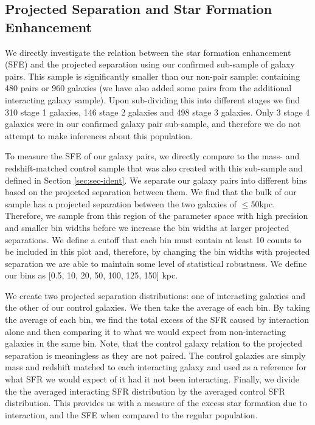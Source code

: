 \subsection{Projected Separation and Star Formation Enhancement}
\noindent We directly investigate the relation between the star formation enhancement (SFE) and the projected separation using our confirmed sub-sample of galaxy pairs. This sample is significantly smaller than our non-pair sample: containing 480 pairs or 960 galaxies (we have also added some pairs from the additional interacting galaxy sample). Upon sub-dividing this into different stages we find 310 stage 1 galaxies, 146 stage 2 galaxies and 498 stage 3 galaxies. Only 3 stage 4 galaxies were in our confirmed galaxy pair sub-sample, and therefore we do not attempt to make inferences about this population. 

To measure the SFE of our galaxy pairs, we directly compare to the mass- and redshift-matched control sample that was also created with this sub-sample and defined in Section \ref{sec:sec-ident}. We separate our galaxy pairs into different bins based on the projected separation between them. We find that the bulk of our sample has a projected separation between the two galaxies of $\leq$50kpc. Therefore, we sample from this region of the parameter space with high precision and smaller bin widths before we increase the bin widths at larger projected separations. We define a cutoff that each bin must contain at least 10 counts to be included in this plot and, therefore, by changing the bin widths with projected separation we are able to maintain some level of statistical robustness. We define our bins as [0.5, 10, 20, 50, 100, 125, 150] kpc.

We create two projected separation distributions: one of interacting galaxies and the other of our control galaxies. We then take the average of each bin. By taking the average of each bin, we find the total excess of the SFR caused by interaction alone and then comparing it to what we would expect from non-interacting galaxies in the same bin. Note, that the control galaxy relation to the projected separation is meaningless as they are not paired. The control galaxies are simply mass and redshift matched to each interacting galaxy and used as a reference for what SFR we would expect of it had it not been interacting. Finally, we divide the the averaged interacting SFR distribution by the averaged control SFR distribution. This provides us with a measure of the excess star formation due to interaction, and the SFE when compared to the regular population.

